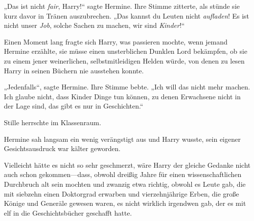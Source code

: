 „Das ist nicht \emph{fair}, Harry!“ sagte Hermine. Ihre Stimme zitterte, als stünde sie kurz davor in Tränen auszubrechen. „Das kannst du Leuten nicht \emph{aufladen}! Es ist nicht unser \emph{Job}, solche Sachen zu machen, wir sind \emph{Kinder}!“

Einen Moment lang fragte sich Harry, was passieren mochte, wenn jemand Hermine erzählte, sie müsse einen unsterblichen Dunklen Lord bekämpfen, ob sie zu einem jener weinerlichen, selbstmitleidigen Helden würde, von denen zu lesen Harry in seinen Büchern nie ausstehen konnte.

„Jedenfalls“, sagte Hermine. Ihre Stimme bebte. „Ich will das nicht mehr machen. Ich glaube nicht, dass Kinder Dinge tun können, zu denen Erwachsene nicht in der Lage sind, das gibt es nur in Geschichten.“

Stille herrschte im Klassenraum.

Hermine sah langsam ein wenig verängstigt aus und Harry wusste, sein eigener Gesichtsausdruck war kälter geworden.

Vielleicht hätte es nicht so sehr geschmerzt, wäre Harry der gleiche Gedanke nicht auch schon gekommen—dass, obwohl dreißig Jahre für einen wissenschaftlichen Durchbruch alt sein mochten und zwanzig etwa richtig, obwohl es Leute gab, die mit siebzehn einen Doktorgrad erwarben und vierzehnjährige Erben, die große Könige und Generäle gewesen waren, es nicht wirklich irgendwen gab, der es mit elf in die Geschichtsbücher geschafft hatte.

